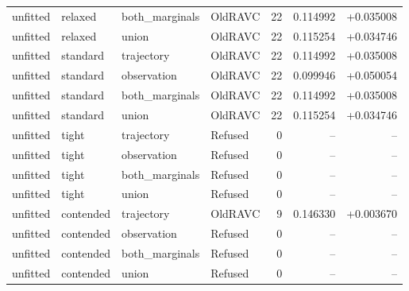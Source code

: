 \begin{longtable}{@{}llllrrr@{}}
unfitted & relaxed & both\_marginals & OldRAVC & 22 & 0.114992 & +0.035008\\
unfitted & relaxed & union & OldRAVC & 22 & 0.115254 & +0.034746\\
unfitted & standard & trajectory & OldRAVC & 22 & 0.114992 & +0.035008\\
unfitted & standard & observation & OldRAVC & 22 & 0.099946 & +0.050054\\
unfitted & standard & both\_marginals & OldRAVC & 22 & 0.114992 & +0.035008\\
unfitted & standard & union & OldRAVC & 22 & 0.115254 & +0.034746\\
unfitted & tight & trajectory & Refused & 0 & -- & --\\
unfitted & tight & observation & Refused & 0 & -- & --\\
unfitted & tight & both\_marginals & Refused & 0 & -- & --\\
unfitted & tight & union & Refused & 0 & -- & --\\
unfitted & contended & trajectory & OldRAVC & 9 & 0.146330 & +0.003670\\
unfitted & contended & observation & Refused & 0 & -- & --\\
unfitted & contended & both\_marginals & Refused & 0 & -- & --\\
unfitted & contended & union & Refused & 0 & -- & --\\
\bottomrule\end{longtable}\normalsize
